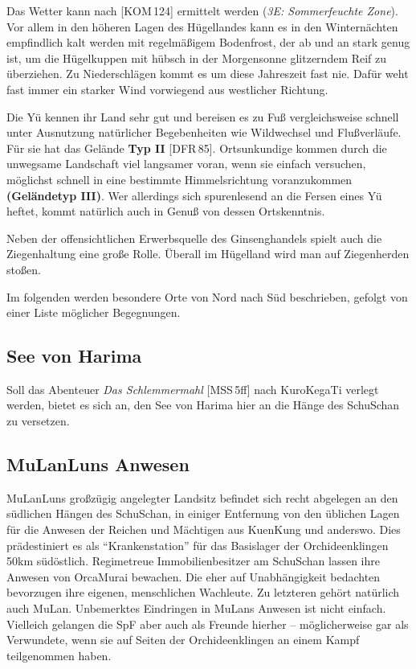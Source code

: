 \documentclass[
a4paper,
twoside,
DIV=calc,
BCOR=4mm,
fontsize=9pt,
twocolumn=on,
titlepage=on,
parskip=half
]{scrartcl}
\begin{document}
Das Wetter kann nach [KOM\,124] ermittelt werden (\emph{3E:
  Sommerfeuchte Zone}). Vor allem in den höheren Lagen des Hügellandes
kann es in den Winternächten empfindlich kalt werden mit regelmäßigem
Bodenfrost, der ab und an stark genug ist, um die Hügelkuppen mit
hübsch in der Morgensonne glitzerndem Reif zu überziehen. Zu
Niederschlägen kommt es um diese Jahreszeit fast nie. Dafür weht fast
immer ein starker Wind vorwiegend aus westlicher Richtung.

Die Yü kennen ihr Land sehr gut und bereisen es zu Fuß vergleichsweise
schnell unter Ausnutzung natürlicher Begebenheiten wie Wildwechsel und
Flußverläufe. Für sie hat das Gelände \textbf{Typ II}
[DFR\,85]. Ortsunkundige kommen durch die unwegsame Landschaft viel
langsamer voran, wenn sie einfach versuchen, möglichst schnell in eine
bestimmte Himmelsrichtung voranzukommen \textbf{(Geländetyp III)}. Wer
allerdings sich spurenlesend an die Fersen eines Yü heftet, kommt
natürlich auch in Genuß von dessen Ortskenntnis.

Neben der offensichtlichen Erwerbsquelle des Ginsenghandels spielt
auch die Ziegenhaltung eine große Rolle. Überall im Hügelland wird
man auf Ziegenherden stoßen.

Im folgenden werden besondere Orte von Nord nach Süd beschrieben,
gefolgt von einer Liste möglicher Begegnungen.

\subsection{See von Harima}

Soll das Abenteuer \emph{Das Schlemmermahl} [MSS\,5ff] nach KuroKegaTi
verlegt werden, bietet es sich an, den See von Harima hier an die
Hänge des SchuSchan zu versetzen.

\subsection{MuLanLuns Anwesen}
\label{mulanlus-anwesen}

MuLanLuns großzügig angelegter Landsitz befindet sich recht abgelegen
an den südlichen Hängen des SchuSchan, in einiger Entfernung von den
üblichen Lagen für die Anwesen der Reichen und Mächtigen aus KuenKung
und anderswo. Dies prädestiniert es als "`Krankenstation"' für das
Basislager der Orchideenklingen 50km südöstlich. Regimetreue
Immobilienbesitzer am SchuSchan lassen ihre Anwesen von OrcaMurai
bewachen. Die eher auf Unabhängigkeit bedachten bevorzugen ihre
eigenen, menschlichen Wachleute. Zu letzteren gehört natürlich auch
MuLan. Unbemerktes Eindringen in MuLans Anwesen ist nicht
einfach. Vielleich gelangen die SpF aber auch als Freunde hierher --
möglicherweise gar als Verwundete, wenn sie auf Seiten der
Orchideenklingen an einem Kampf teilgenommen haben.
\end{document}
